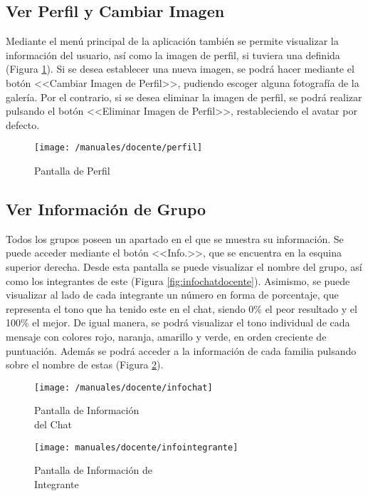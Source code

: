 \clearpage

\subsection*{Ver Perfil y Cambiar Imagen}
Mediante el menú principal de la aplicación también se permite visualizar la información del usuario, así como la imagen de perfil, si tuviera una definida (Figura \ref{fig:perfildocente}). Si se desea establecer una nueva imagen, se podrá hacer mediante el botón <<Cambiar Imagen de Perfil>>, pudiendo escoger alguna fotografía de la galería. Por el contrario, si se desea eliminar la imagen de perfil, se podrá realizar pulsando el botón <<Eliminar Imagen de Perfil>>, restableciendo el avatar por defecto.

\begin{figure}[!h]
	\begin{center}
		\texttt{[image: /manuales/docente/perfil]}
		\caption{Pantalla de Perfil}
		\label{fig:perfildocente}
	\end{center}
\end{figure}

\clearpage

\subsection*{Ver Información de Grupo}
Todos los grupos poseen un apartado en el que se muestra su información. Se puede acceder mediante el botón <<Info.>>, que se encuentra en la esquina superior derecha. Desde esta pantalla se puede visualizar el nombre del grupo, así como los integrantes de este (Figura \ref{fig:infochatdocente}). Asimismo, se puede visualizar al lado de cada integrante un número en forma de porcentaje, que representa el tono que ha tenido este en el chat, siendo 0\% el peor resultado y el 100\% el mejor. De igual manera, se podrá visualizar el tono individual de cada mensaje con colores rojo, naranja, amarillo y verde, en orden creciente de puntuación. Además se podrá acceder a la información de cada familia pulsando sobre el nombre de estas (Figura \ref{fig:infointegrantedocente}).

\begin{figure}[!h]
	\centering
	\begin{minipage}{.5\textwidth}
		\centering
		\texttt{[image: /manuales/docente/infochat]}
		\caption{Pantalla de Información \\ del Chat}
		\label{fig:infochatdocente}
	\end{minipage}%
	\begin{minipage}{.5\textwidth}
		\centering
		\texttt{[image: manuales/docente/infointegrante]}
		\caption{Pantalla de Información de \\ Integrante}
		\label{fig:infointegrantedocente}
	\end{minipage}
\end{figure}

